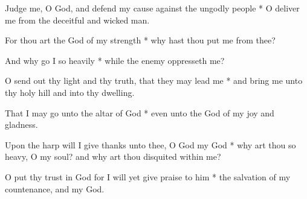Judge me, O God, and defend my cause against the ungodly people * O deliver me from the deceitful and wicked man.

For thou art the God of my strength * why hast thou put me from thee?

And why go I so heavily * while the enemy oppresseth me?

O send out thy light and thy truth, that they may lead me * and bring me unto thy holy hill and into thy dwelling.

That I may go unto the altar of God * even unto the God of my joy and gladness.

Upon the harp will I give thanks unto thee, O God my God * why art thou so heavy, O my soul? and why art thou disquited within me?

O put thy trust in God for I will yet give praise to him * the salvation of my countenance, and my God.